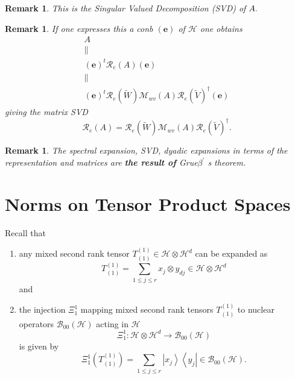 \documentclass[aps,preprint]{revtex4}
\newtheorem{remark}[theorem]{Remark}
\begin{document}
\begin{remark}
{\Large This is the Singular Valued Decomposition (SVD) of }${\Large A}.$
\end{remark}

\begin{remark}
If one expresses this a conb $\left( \boldsymbol{e}\right) $ of $\mathcal{H}$
one obtains 
\begin{gather}
A \\
\parallel \\
\left( \boldsymbol{e}\right) ^{t}\mathcal{R}_{e}\left( A\right) \left( 
\boldsymbol{e}\right) \\
\parallel \\
\left( \boldsymbol{e}\right) ^{t}\mathcal{R}_{e}\left( \widetilde{W}\right) 
\mathcal{M}_{wv}\left( A\right) \mathcal{R}_{e}\left( \widetilde{V}\right)
^{\dagger }\left( \boldsymbol{e}\right)
\end{gather}%
giving the \emph{matrix} SVD 
\begin{equation}
\mathcal{R}_{e}\left( A\right) =\mathcal{R}_{e}\left( \widetilde{W}\right) 
\mathcal{M}_{wv}\left( A\right) \mathcal{R}_{e}\left( \widetilde{V}\right)
^{\dagger }.
\end{equation}
\end{remark}

\begin{remark}
The spectral expansion, SVD, dyadic expansions in terms of the
representation and matrices are \textbf{the result of} Grue$\beta ^{\prime }$%
s theorem.
\end{remark}

\section{Norms on Tensor Product Spaces}

Recall that

\begin{enumerate}
\item any mixed second rank tensor $T_{\left( 1\right) }^{\left( 1\right)
}\in \mathcal{H\otimes }\mathcal{H}^{d}$ can be expanded as 
\begin{equation}
T_{\left( 1\right) }^{\left( 1\right) }=\sum_{1\leq j\leq r}x_{j}\otimes
y_{dj}\in \mathcal{H}\otimes \mathcal{H}^{d}
\end{equation}%
and

\item the injection $\Xi _{1}^{1}$ mapping mixed second rank tensors $%
T_{\left( 1\right) }^{\left( 1\right) }$ to nuclear operators $\mathcal{B}%
_{00}\left( \mathcal{H}\right) $ acting in $\mathcal{H}$ 
\begin{equation}
\Xi _{1}^{1}:\mathcal{H\otimes }\mathcal{H}^{d}\rightarrow \mathcal{B}%
_{00}\left( \mathcal{H}\right)
\end{equation}
is given by 
\begin{equation}
\Xi _{1}^{1}\left( T_{\left( 1\right) }^{\left( 1\right) }\right)
=\sum_{1\leq j\leq r}\left\vert x_{j}\right\rangle \left\langle
y_{j}\right\vert \in \mathcal{B}_{00}\left( \mathcal{H}\right) .
\end{equation}
\end{enumerate}
\end{document}
